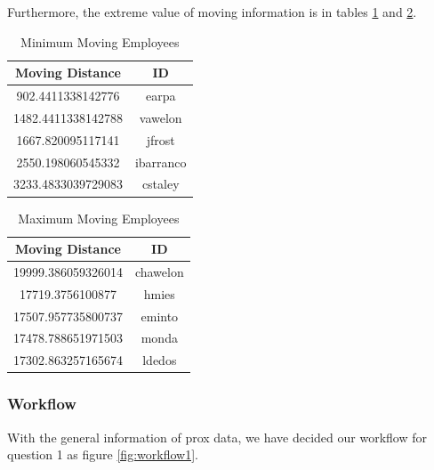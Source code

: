 \documentclass[aps, 10pt, a4paper]{article}
\begin{document}
                Furthermore, the extreme value of moving information is in tables \ref{tb:movemin} and \ref{tb:movemax}.
                
                \begin{table}[htbp]
                    \centering
                    \caption{Minimum Moving Employees}
                    \label{tb:movemin}
                    \begin{tabular}{c|c}
                        Moving Distance & ID \\ \hline
                        902.4411338142776 & earpa \\
                        1482.4411338142788 & vawelon \\
                        1667.820095117141 & jfrost \\
                        2550.198060545332 & ibarranco \\
                        3233.4833039729083 & cstaley \\
                    \end{tabular}
                \end{table}
            
                \begin{table}[htbp]
                    \centering
                    \caption{Maximum Moving Employees}
                    \label{tb:movemax}
                    \begin{tabular}{c|c}
                        Moving Distance & ID \\ \hline
                        19999.386059326014 & chawelon \\
                        17719.3756100877 & hmies \\
                        17507.957735800737 & eminto \\
                        17478.788651971503 & monda \\
                        17302.863257165674 & ldedos \\
                    \end{tabular}
                \end{table}
            
            \subsubsection{Workflow}
                With the general information of prox data, we have decided our workflow for question 1 as figure \ref{fig:workflow1}.
                
\end{document}
